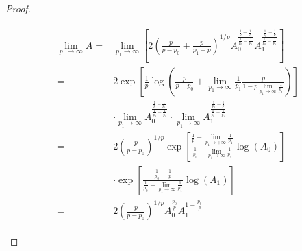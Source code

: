 \begin{proof}
\begin{enumerate}[label = \textbf{(\roman*.)}]
\begin{enumerate}[label = \textbf{\alph*.}]
	\begin{gather*}
		\begin{aligned}
			\lim\limits_{p_1 \rightarrow \infty} A =& \lim\limits_{p_1 \rightarrow \infty}	\left[2\left( \frac{p}{p - p_0} + \frac{p}{p_1 - p} \right)^{1/p}A_0^{\frac{\frac{1}{p} - \frac{1}{p_1}}{\frac{1}{p_0}-\frac{1}{p_1}}}A_1^{\frac{\frac{1}{p_0}-\frac{1}{p}}{\frac{1}{p_0}-\frac{1}{p_1}}}\right]\\
			=& 2\exp\left[ \frac{1}{p} \log\left(\frac{p}{p - p_0} + \lim\limits_{p_1 \rightarrow \infty} \frac{1}{p_1}\frac{p}{1 - p\lim\limits_{p_1 \rightarrow \infty}\frac{1}{p_1}}\right)\right]\\
			& \cdot \lim\limits_{p_1 \rightarrow \infty}A_0^{\frac{\frac{1}{p} - \frac{1}{p_1}}{\frac{1}{p_0}-\frac{1}{p_1}}}\cdot\lim\limits_{p_1 \rightarrow \infty}A_1^{\frac{\frac{1}{p_0}-\frac{1}{p}}{\frac{1}{p_0}-\frac{1}{p_1}}}\\
		=& 2\left( \frac{p}{p - p_0} \right)^{1/p} \exp\left[\displaystyle\frac{\frac{1}{p} - \lim\limits_{p_1 \rightarrow + \infty}\frac{1}{p_1}}{\frac{1}{p_0}-\lim\limits_{p_1 \rightarrow \infty}\frac{1}{p_1}}\log(A_0)\right]\\
		& \cdot \exp\left[\frac{\frac{1}{p_0}-\frac{1}{p}}{\frac{1}{p_0}-\lim\limits_{p_1 \rightarrow \infty}\frac{1}{p_1}}\log(A_1)\right]\\
		=& 2\left( \frac{p}{p - p_0} \right)^{1/p} A_0^{\frac{p_0}{p}} A_1^{1 - \frac{p_0}{p}}
		\end{aligned}
	\end{gather*}
	\end{enumerate}

\end{enumerate}
\end{proof}
